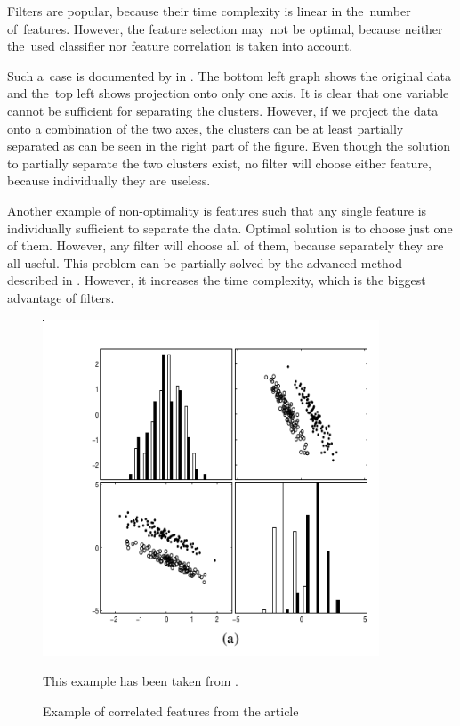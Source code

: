 Filters are popular, because their time complexity is linear in the~number of~features.
However, the feature selection may~not be optimal,
because neither the~used classifier nor feature correlation is taken into account.

Such a~case is documented by \citet{GuyEli03} in .
The bottom left graph shows the original data and the~top left shows projection onto only one axis.
It is clear that one variable cannot be sufficient for separating the clusters.
However, if we project the data onto a combination of the two axes,
the clusters can be at least partially separated as can be seen in the right part of the figure.
Even though the solution to partially separate the two clusters exist,
no filter will choose either feature, because individually they are useless.

Another example of non-optimality is
features such that any single feature is individually sufficient to separate the data.
Optimal solution is  to choose just one of them.
However, any filter will choose all of them, because separately they are all useful.
This problem can be partially solved by the advanced method described in .
However, it increases the time complexity, which is the biggest advantage of filters.

 

\begin{figure}[ht]\centering
\includegraphics[width=100mm]{../img/guyeli_figure3.png}
\caption{Example of correlated features from the article}
This example has been taken from \citet{GuyEli03}.
\label{fig:guyeli03-figure3}
\end{figure}

